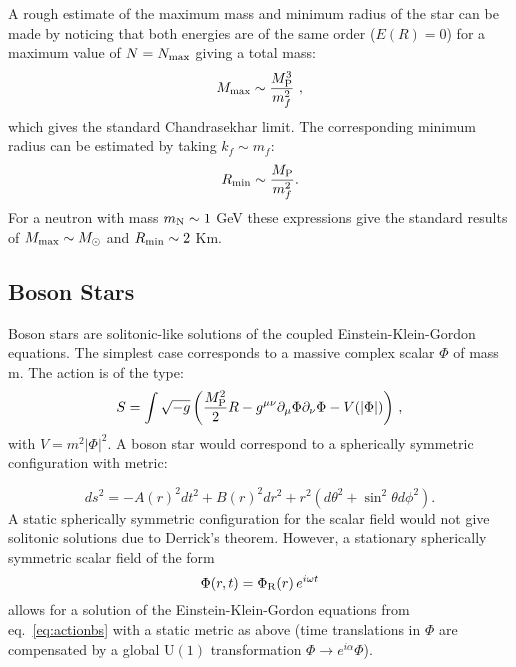 \documentclass[11pt,a4paper]{article}
\newcommand{\be}{\begin{equation}}
\newcommand{\ee}{\end{equation}}
\begin{document}
A rough estimate of the maximum mass and minimum radius of the star can be made by noticing that both energies are of the same order ($E(R)=0$) for a maximum  value of $N=N_{\rm max}$ 
giving a total mass:
\be
M_{\rm max}\sim \frac{M_{\rm P}^3}{m_f^2}~,
\ee
which gives the standard Chandrasekhar limit. The corresponding minimum radius can be estimated  by taking $k_f\sim m_f$:
\be
R_{\rm min}\sim \frac{M_{\rm P}}{m_f^2}.
\ee 
For a neutron with mass $m_{\rm N}\sim 1$ GeV these expressions give the standard results of $M_{\rm max}\sim M_\odot$ and $R_{\rm min}\sim 2$ Km. 


\subsection{Boson Stars}
\label{sec:BosonStars}

Boson stars are solitonic-like solutions of the coupled Einstein-Klein-Gordon equations. The simplest case corresponds to a massive complex scalar $\Phi$ of mass m. The action is of the type:
\be
S=\int \sqrt{-g}\left(\frac{M_{\rm P}^2}{2} R-g^{\mu \nu}\partial_\mu \Phi \partial_\nu \Phi - V(|\Phi|)\right) \,,
\label{eq:actionbs}
\ee
with $V=m^2|\Phi|^2$.
A boson star would correspond to a spherically symmetric configuration with metric:

\be
ds^2= -A(r)^2 dt^2 + B(r)^2 dr^2 + r^2 \left(d\theta^2 + \sin^2\theta d\phi^2\right).
\label{eq:metricansatz}
\ee
A static spherically symmetric configuration for the scalar field would not give solitonic solutions due to Derrick's theorem. However, a stationary spherically symmetric scalar field of the form
\be
\Phi(r,t)=\Phi_{\rm R} (r)\, e^{i\omega t}
\ee
allows for a solution of the Einstein-Klein-Gordon equations from eq.~\eqref{eq:actionbs} with a static metric as above (time translations in $\Phi$ are compensated by a global U$(1)$ transformation $\Phi\to e^{i\alpha}\Phi$).
\end{document}
